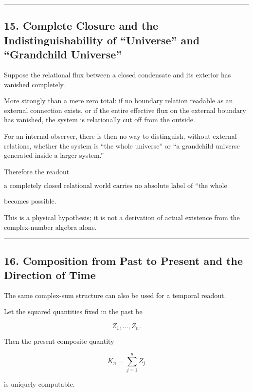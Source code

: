 \documentclass[
  a4paper,
]{article}
\begin{document}
\begin{center}\rule{0.5\linewidth}{0.5pt}\end{center}

\subsection{15. Complete Closure and the Indistinguishability of
``Universe'' and ``Grandchild
Universe''}\label{complete-closure-and-the-indistinguishability-of-universe-and-grandchild-universe}

Suppose the relational flux between a closed condensate and its exterior
has vanished completely.

More strongly than a mere zero total: if no boundary relation readable
as an external connection exists, or if the entire effective flux on the
external boundary has vanished, the system is relationally cut off from
the outside.

For an internal observer, there is then no way to distinguish, without
external relations, whether the system is ``the whole universe'' or ``a
grandchild universe generated inside a larger system.''

Therefore the readout

\[
\boxed{\text{a completely closed relational world carries no absolute label of “the whole universe”}}
\]

becomes possible.

This is a physical hypothesis; it is not a derivation of actual
existence from the complex-number algebra alone.

\begin{center}\rule{0.5\linewidth}{0.5pt}\end{center}

\subsection{16. Composition from Past to Present and the Direction of
Time}\label{composition-from-past-to-present-and-the-direction-of-time}

The same complex-sum structure can also be used for a temporal readout.

Let the squared quantities fixed in the past be

\[
Z_1,\ldots,Z_n.
\]

Then the present composite quantity

\[
K_n=\sum_{j=1}^{n}Z_j
\]

is uniquely computable.
\end{document}
